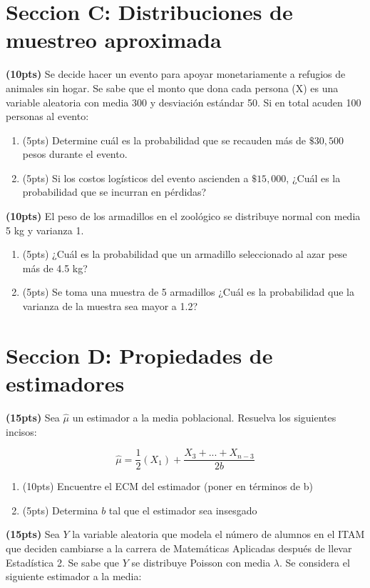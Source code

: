 \documentclass[addpoints]{exam}
\theoremstyle{mytheor}
\begin{document}
\begin{questions}
\section*{Seccion C: Distribuciones de muestreo aproximada}

\question \textbf{(10pts)} 
Se decide hacer un evento para apoyar monetariamente a refugios de animales sin hogar. Se sabe que el monto que dona cada persona (X) es una variable aleatoria con media 300 y desviación estándar 50. Si en total acuden 100 personas al evento:

\begin{enumerate}[label=\Alph*)]
\item (5pts) Determine cuál es la probabilidad que se recauden más de $\$30,500$ pesos durante el evento.
\item (5pts) Si los costos logísticos del evento ascienden a $\$15,000$, ¿Cuál es la probabilidad que se incurran en pérdidas?
\end{enumerate}

\question \textbf{(10pts)} El peso de los armadillos en el zoológico se distribuye normal con media 5 kg y varianza 1.

\begin{enumerate}[label=\Alph*)]
\item (5pts) ¿Cuál es la probabilidad que un armadillo seleccionado al azar pese más de 4.5 kg?
\item (5pts) Se toma una muestra de 5 armadillos ¿Cuál es la probabilidad que la varianza de la muestra sea mayor a 1.2?
\end{enumerate}
  

\section*{Seccion D: Propiedades de estimadores}

\question \textbf{(15pts)} Sea $\hat{\mu}$ un estimador a la media poblacional. Resuelva los siguientes incisos: 
   
$$\hat{\mu} = \frac{1}{2} (X_1) + \frac{X_3+...+X_{n-3}}{2b} $$

\begin{enumerate}[label=\Alph*)]
\item (10pts) Encuentre el ECM del estimador (poner en términos de b)
\item (5pts) Determina $b$ tal que el estimador sea insesgado
\end{enumerate}

\question \textbf{(15pts)} Sea $Y$ la variable aleatoria que modela el número de alumnos en el ITAM que deciden cambiarse a la carrera de Matemáticas Aplicadas después de llevar Estadística 2. Se sabe que $Y$ se distribuye Poisson con media $\lambda$. Se considera el siguiente estimador a la media:


\end{questions}
\end{document}
